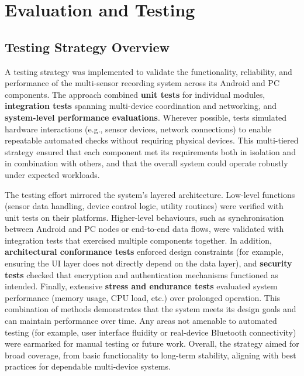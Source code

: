 \chapter{Evaluation and Testing}


\section{Testing Strategy Overview}
A testing strategy was implemented to validate the functionality, reliability, and performance of the multi-sensor recording system across its Android and PC components. The approach combined \textbf{unit tests} for individual modules, \textbf{integration tests} spanning multi-device coordination and networking, and \textbf{system-level performance evaluations}. Wherever possible, tests simulated hardware interactions (e.g., sensor devices, network connections) to enable repeatable automated checks without requiring physical devices. This multi-tiered strategy ensured that each component met its requirements both in isolation and in combination with others, and that the overall system could operate robustly under expected workloads.

The testing effort mirrored the system's layered architecture. Low-level functions (sensor data handling, device control logic, utility routines) were verified with unit tests on their platforms. Higher-level behaviours, such as synchronisation between Android and PC nodes or end-to-end data flows, were validated with integration tests that exercised multiple components together. In addition, \textbf{architectural conformance tests} enforced design constraints (for example, ensuring the UI layer does not directly depend on the data layer), and \textbf{security tests} checked that encryption and authentication mechanisms functioned as intended. Finally, extensive \textbf{stress and endurance tests} evaluated system performance (memory usage, CPU load, etc.) over prolonged operation. This combination of methods demonstrates that the system meets its design goals and can maintain performance over time. Any areas not amenable to automated testing (for example, user interface fluidity or real-device Bluetooth connectivity) were earmarked for manual testing or future work. Overall, the strategy aimed for broad coverage, from basic functionality to long-term stability, aligning with best practices for dependable multi-device systems.


